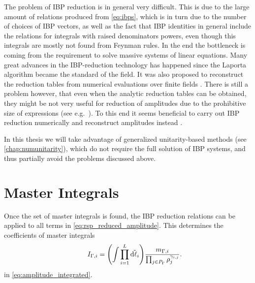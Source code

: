 The problem of IBP reduction is in general very difficult.
This is due to the large amount of relations produced from \cref{eq:ibps},
which is in turn due to the number of choices of IBP vectors, as well as the fact that IBP identities
in general include the relations for integrals with raised denominators powers, even
though this integrals are mostly not found from Feynman rules.
In the end the bottleneck is coming from the requirement to solve massive systems of linear equations.
Many great advances in the IBP-reduction technology has happened
\cite{Gluza:2010ws,Schabinger:2011dz,Larsen:2015ped,Bern:2017gdk,Chawdhry:2018awn,Badger:2008cm,Kosower:2018obg,Mastrolia:2018uzb,Frellesvig:2019kgj,Frellesvig:2019uqt,Bendle2019}
since the Laporta algorithm became the standard of the field.
It was also proposed to reconstruct the reduction tables from
numerical evaluations over finite fields \cite{vonManteuffel:2014ixa,Peraro:2016wsq,Peraro:2019svx,Klappert:2019emp,Smirnov:2019qkx}.
There is still a problem however,
that even when the analytic reduction tables can be obtained,
they might be not very useful for reduction of amplitudes due
to the prohibitive size of expressions (see e.g.\ \cite{Chawdhry:2018awn,Bendle2019}).
To this end it seems beneficial to carry out IBP reduction numerically and reconstruct
amplitudes instead \cite{Badger:2018enw,Chicherin:2018yne,Badger:2019djh}.

In this thesis we will take advantage of generalized unitarity-based methods (see \cref{chap:numunitarity}),
which do not require the full solution of IBP systems, and thus
partially avoid the problems discussed above.




\section{Master Integrals}

Once the set of master integrals is found, the IBP reduction relations can be applied 
to all terms in \cref{eq:rsp_reduced_amplitude}.
This determines the coefficients of master integrals
\begin{equation} \label{eq:master_integrals}
    \qquad I_{\Gamma,i} = 
    \qty(\int \prod_{i=1}^{L} \tilde{\dd{\ell_i}}) \frac{m_{\Gamma,i}}{\prod_{j\in P_\Gamma} \rho_j^{\gamma_{i,j}}}.
\end{equation}
in \cref{eq:amplitude_integrated}.

